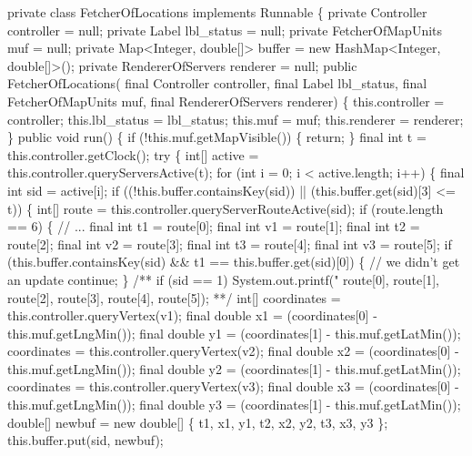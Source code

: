 \nwenddocs{}\plusendmoddef
private class FetcherOfLocations implements Runnable \{
  private Controller controller = null;
  private Label lbl_status = null;
  private FetcherOfMapUnits muf = null;
  private Map<Integer, double[]> buffer = new HashMap<Integer, double[]>();
  private RendererOfServers renderer = null;
  public FetcherOfLocations(
      final Controller controller,
      final Label lbl_status,
      final FetcherOfMapUnits muf,
      final RendererOfServers renderer) \{
    this.controller = controller;
    this.lbl_status = lbl_status;
    this.muf = muf;
    this.renderer = renderer;
  \}
  public void run() \{
    if (!this.muf.getMapVisible()) \{
      return;
    \}
    final int t = this.controller.getClock();
    try \{
      int[] active = this.controller.queryServersActive(t);
      for (int i = 0; i < active.length; i++) \{
        final int sid = active[i];
        if ((!this.buffer.containsKey(sid)) || (this.buffer.get(sid)[3] <= t)) \{
          int[] route = this.controller.queryServerRouteActive(sid);
          if (route.length == 6) \{  // ...
            final int t1 = route[0];
            final int v1 = route[1];
            final int t2 = route[2];
            final int v2 = route[3];
            final int t3 = route[4];
            final int v3 = route[5];
if (this.buffer.containsKey(sid) && t1 == this.buffer.get(sid)[0]) \{
  // we didn't get an update
  continue;
\}
/**
if (sid == 1) System.out.printf("%
    route[0],
    route[1],
    route[2],
    route[3],
    route[4],
    route[5]);
**/
            int[] coordinates = this.controller.queryVertex(v1);
            final double x1 = (coordinates[0] - this.muf.getLngMin());
            final double y1 = (coordinates[1] - this.muf.getLatMin());
            coordinates = this.controller.queryVertex(v2);
            final double x2 = (coordinates[0] - this.muf.getLngMin());
            final double y2 = (coordinates[1] - this.muf.getLatMin());
            coordinates = this.controller.queryVertex(v3);
            final double x3 = (coordinates[0] - this.muf.getLngMin());
            final double y3 = (coordinates[1] - this.muf.getLatMin());
            double[] newbuf = new double[] \{ t1, x1, y1, t2, x2, y2, t3, x3, y3 \};
            this.buffer.put(sid, newbuf);
